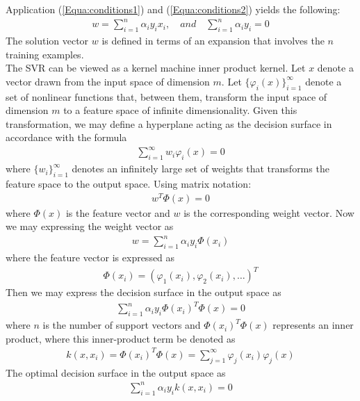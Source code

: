 Application (\ref{Equa:conditions1}) and (\ref{Equa:conditions2}) yields
the following:
 \begin{align}
 w=\sum_{i=1}^{n}\alpha_{i}y_{i}x_{i},\quad\textit{and}\quad \sum_{i=1}^{n}\alpha_{i}y_{i}=0
 \end{align}
 The solution vector $w$ is defined in terms of an expansion that involves the $n$ training
 examples.\\
 The SVR can be viewed as a kernel machine inner product kernel.
 Let $x$ denote a vector drawn from the input space of dimension $m$. Let 
 $\{\varphi_{i}(x)\}_{i=1}^{\infty}$ denote  a set of nonlinear functions that, 
 between them, transform the input space of dimension $m$ to a feature space of
  infinite dimensionality. Given this transformation, we may define
 a hyperplane acting as the decision surface in accordance with the formula
 \begin{align*}
 \sum_{i=1}^{\infty}w_{i}\varphi_{i}(x)=0
 \end{align*}
 where  $\{w_{i}\}_{i=1}^{\infty}$ denotes an infinitely 
 large set of  weights that transforms the feature space  to the output space.
 Using matrix notation:
  \begin{align}
 w^{T}\Phi(x)=0
  \end{align}
  where $\Phi(x)$ is the feature vector and $w$ is the corresponding weight vector.
 Now we may expressing the weight vector as
   \begin{align}
  w=\sum_{i=1}^{n}\alpha_{i}y_{i}\Phi(x_{i})
  \end{align}
  where the feature vector is expressed as
   \begin{align}
   	\Phi(x_{i})=\left(\varphi_{1}(x_{i}),\varphi_{2}(x_{i}),\ldots \right)^{T}
\end{align}
 Then we may express the decision surface in the output space as
 \begin{align*}
 \sum_{i=1}^{n}\alpha_{i}y_{i}\Phi(x_{i})^{T}\Phi(x)=0
 \end{align*}
 where $n$ is the number of support vectors and $\Phi(x_{i})^{T}\Phi(x)$ represents an
 inner product, where this inner-product term be denoted as
 \begin{align}
 k\left(x,x_{i}\right)= \Phi(x_{i})^{T}\Phi(x)=\sum_{j=1}^{\infty}\varphi_{j}(x_{i})\varphi_{j}(x)
 \end{align}
 The optimal decision surface in the output space as
 \begin{align}
 \sum_{i=1}^{n}\alpha_{i}y_{i} k\left(x,x_{i}\right)=0
 \end{align}
